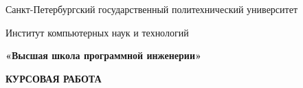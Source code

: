 \documentclass[12pt]{article}
\begin{document}
\begin{titlepage}
\begin{Center}
{\fontsize{14pt}{16.8pt}\selectfont Санкт-Петербургский государственный политехнический университет\par}
\end{Center}\par

\begin{Center}
{\fontsize{14pt}{16.8pt}\selectfont Институт компьютерных наук и технологий\par}
\end{Center}\par

\begin{Center}
{\fontsize{14pt}{16.8pt}\selectfont \textbf{«Высшая школа программной инженерии»}\par}
\end{Center}\par


\vspace{\baselineskip}

\vspace{\baselineskip}

\vspace{\baselineskip}

\vspace{\baselineskip}

\vspace{\baselineskip}

\vspace{\baselineskip}

\vspace{\baselineskip}

\vspace{\baselineskip}

\vspace{\baselineskip}

\vspace{\baselineskip}

\vspace{\baselineskip}

\vspace{\baselineskip}

\vspace{\baselineskip}
\begin{Center}
{\fontsize{16pt}{19.2pt}\selectfont \textbf{КУРСОВАЯ РАБОТА}\par}
\end{Center}\par



\end{titlepage}
\end{document}

